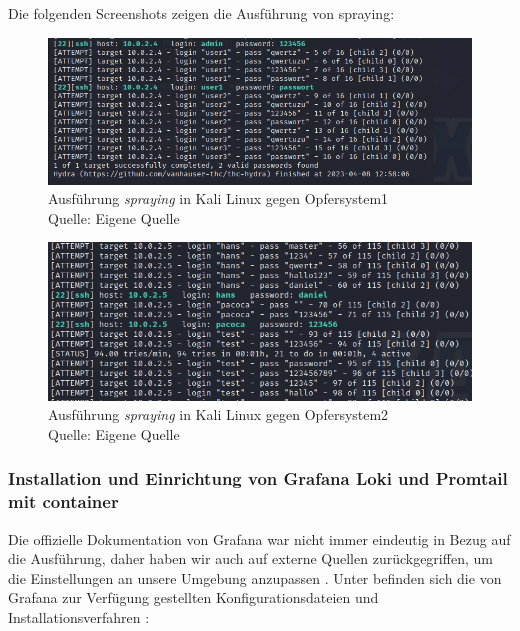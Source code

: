 \newpage
Die folgenden Screenshots zeigen die Ausführung von \gls{spraying}:
\begin{figure}[H]
   \centering
   \includegraphics[width=1\textwidth]{assets/Spraying_Kali.png}
   \caption[Ausführung \textit{\gls{spraying}} in Kali Linux gegen Opfersystem1]
   {Ausführung \textit{\gls{spraying}} in Kali Linux gegen Opfersystem1\\Quelle: Eigene Quelle}
   \centering
\end{figure}

\begin{figure}[H]
   \centering
   \includegraphics[width=1\textwidth]{assets/Spraying_Kali2.png}
   \caption[Ausführung \textit{\gls{spraying}} in Kali Linux gegen Opfersystem2]
   {Ausführung \textit{\gls{spraying}} in Kali Linux gegen Opfersystem2\\Quelle: Eigene Quelle}
   \centering
\end{figure}

\newpage
\subsubsection{Installation und Einrichtung von Grafana Loki und Promtail mit \gls{container}}
Die offizielle Dokumentation von Grafana war nicht immer eindeutig in Bezug auf die Ausführung, daher haben wir auch auf externe Quellen zurückgegriffen, um die Einstellungen an unsere Umgebung anzupassen \citep{Polinowski_PGL}. Unter befinden sich die von Grafana zur Verfügung gestellten Konfigurationsdateien und Installationsverfahren \citep{GrafanaLoki_run}:

